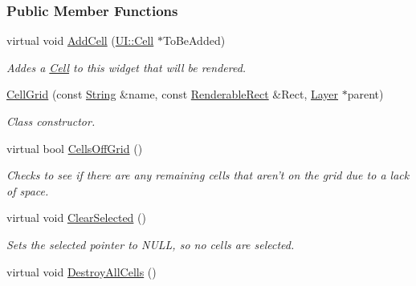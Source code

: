 \subsubsection*{Public Member Functions}
\begin{DoxyCompactItemize}
\item 
virtual void \hyperlink{classMezzanine_1_1UI_1_1CellGrid_ab162c701a9c24dde35709d71edf53972}{AddCell} (\hyperlink{classMezzanine_1_1UI_1_1Cell}{UI::Cell} $\ast$ToBeAdded)
\begin{DoxyCompactList}\small\item\em Addes a \hyperlink{classMezzanine_1_1UI_1_1Cell}{Cell} to this widget that will be rendered. \item\end{DoxyCompactList}\item 
\hyperlink{classMezzanine_1_1UI_1_1CellGrid_a198dfab3b71fbd9f89b7aa76c43881bb}{CellGrid} (const \hyperlink{namespaceMezzanine_acf9fcc130e6ebf08e3d8491aebcf1c86}{String} \&name, const \hyperlink{structMezzanine_1_1UI_1_1RenderableRect}{RenderableRect} \&Rect, \hyperlink{classMezzanine_1_1UI_1_1Layer}{Layer} $\ast$parent)
\begin{DoxyCompactList}\small\item\em Class constructor. \item\end{DoxyCompactList}\item 
virtual bool \hyperlink{classMezzanine_1_1UI_1_1CellGrid_a98a6713c4723fd6021a167380c92d716}{CellsOffGrid} ()
\begin{DoxyCompactList}\small\item\em Checks to see if there are any remaining cells that aren't on the grid due to a lack of space. \item\end{DoxyCompactList}\item 
\hypertarget{classMezzanine_1_1UI_1_1CellGrid_a11e4c5d524ed68823a61011e75bbaddb}{
virtual void \hyperlink{classMezzanine_1_1UI_1_1CellGrid_a11e4c5d524ed68823a61011e75bbaddb}{ClearSelected} ()}
\label{classMezzanine_1_1UI_1_1CellGrid_a11e4c5d524ed68823a61011e75bbaddb}

\begin{DoxyCompactList}\small\item\em Sets the selected pointer to NULL, so no cells are selected. \item\end{DoxyCompactList}\item 
\hypertarget{classMezzanine_1_1UI_1_1CellGrid_ad820c686b028dd5daeed8548b2f8918a}{
virtual void \hyperlink{classMezzanine_1_1UI_1_1CellGrid_ad820c686b028dd5daeed8548b2f8918a}{DestroyAllCells} ()}
\label{classMezzanine_1_1UI_1_1CellGrid_ad820c686b028dd5daeed8548b2f8918a}


\end{DoxyCompactItemize}
